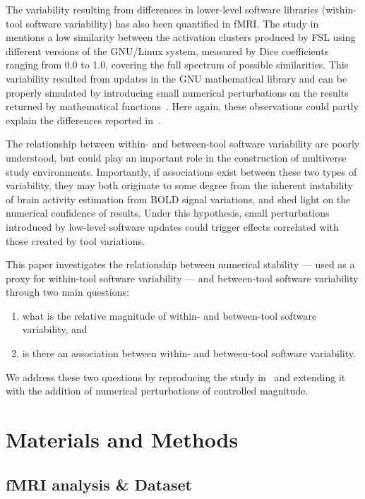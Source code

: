 \documentclass[11pt,onecolumn]{article}
\begin{document}
The variability resulting from differences in lower-level software
libraries (within-tool software variability) has also been quantified in fMRI. The
study in~\cite{Glatard2015} mentions a low similarity between the activation clusters
produced by FSL using different versions of the GNU/Linux system, measured
by Dice coefficients ranging from 0.0 to 1.0, covering the full spectrum of
possible similarities. This variability resulted from updates in the GNU
mathematical library and can be properly simulated by introducing small
numerical perturbations on the results returned by mathematical functions~\cite{salari2021accurate}.
Here again, these observations could partly explain the differences
reported in~\cite{botvinik2020variability}.

The relationship between within- and between-tool software variability are poorly
understood, but could play an important role in the construction of
multiverse study environments. Importantly, if associations exist between
these two types of variability, they may both originate to some degree from
the inherent instability of brain activity estimation from BOLD signal
variations, and shed light on the numerical confidence of results. Under
this hypothesis, small perturbations introduced by low-level software
updates could trigger effects correlated with those created by tool
variations.

This paper investigates the relationship between numerical stability --- used
as a proxy for within-tool software variability --- and between-tool software variability
through two main questions:
\begin{enumerate}
\item what is the relative magnitude of within- and between-tool software variability, and
\item is there an association between within- and between-tool software variability.
\end{enumerate}

We address these two questions by reproducing the study in~\cite{bowring2019exploring} and
extending it with the addition of numerical perturbations of controlled
magnitude.

\section{Materials and Methods}

\subsection{fMRI analysis \& Dataset}
\end{document}
